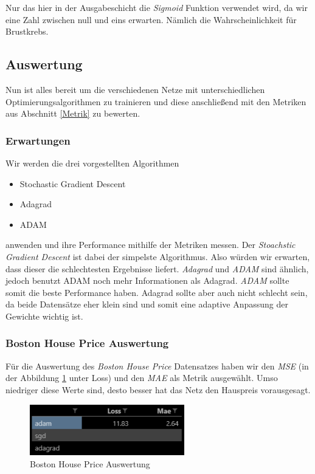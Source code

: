 Nur das hier in der Ausgabeschicht die \textit{Sigmoid} Funktion verwendet wird, 
da wir eine Zahl zwischen null und eins erwarten. Nämlich die Wahrscheinlichkeit
für Brustkrebs. 

\subsection{Auswertung} \label{Auswertung}

Nun ist alles bereit um die verschiedenen Netze mit unterschiedlichen Optimierungsalgorithmen
zu trainieren und diese anschließend mit den Metriken aus Abschnitt \ref{Metrik}
zu bewerten. 

\subsubsection{Erwartungen} \label{Erwartungen}

Wir werden die drei vorgestellten Algorithmen 
\begin{itemize}
    \item Stochastic Gradient Descent
    \item Adagrad
    \item ADAM
\end{itemize}

anwenden und ihre Performance mithilfe der Metriken messen. Der \textit{Stoachstic Gradient Descent}
ist dabei der simpelste Algorithmus. Also würden wir erwarten, dass dieser die schlechtesten 
Ergebnisse liefert. \textit{Adagrad} und \textit{ADAM} sind ähnlich, jedoch 
benutzt ADAM noch mehr Informationen als Adagrad. \textit{ADAM} sollte somit 
die beste Performance haben. Adagrad sollte aber auch nicht schlecht sein, da 
beide Datensätze eher klein sind und somit eine adaptive Anpassung der Gewichte
wichtig ist.

\subsubsection{Boston House Price Auswertung} \label{Boston House Price Auswertung}

Für die Auswertung des \textit{Boston House Price} Datensatzes haben wir den \textit{MSE} (in der Abbildung \ref{fig:BHPAuswertung} unter Loss) und den \textit{MAE} 
als Metrik ausgewählt. Umso niedriger diese Werte sind, desto besser hat das Netz den Hauspreis 
vorausgesagt. 

\begin{figure}[htbp] 
    \centering
       \includegraphics[width=0.6\textwidth]{abb/boston_score.png}
    \caption{Boston House Price Auswertung}
    \label{fig:BHPAuswertung}
\end{figure}

